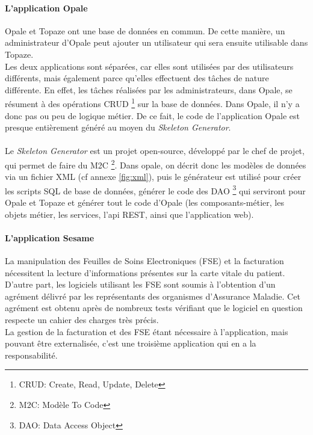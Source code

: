 \paragraph*{L'application Opale\\}
Opale et Topaze ont une base de données en commun. De cette manière, un administrateur d'Opale peut ajouter un utilisateur qui sera ensuite utilisable dans Topaze. \\
Les deux applications sont séparées, car elles sont utilisées par des utilisateurs différents, mais également parce qu'elles effectuent des tâches de nature différente. En effet, les tâches réalisées par les administrateurs, dans Opale, se résument à des opérations CRUD \footnote{CRUD: Create, Read, Update, Delete} sur la base de données. Dans Opale, il n'y a donc pas ou peu de logique métier. 
De ce fait, le code de l'application Opale est presque entièrement généré au moyen du \textit{Skeleton Generator}.\\ \\
Le \textit{Skeleton Generator} est un projet open-source, développé par le chef de projet, qui permet de faire du M2C \footnote{M2C: Modèle To Code}. Dans opale, on décrit donc les modèles de données via un fichier XML (cf annexe \ref{fig:xml}), puis le générateur est utilisé pour créer les scripts SQL de base de données, générer le code des DAO \footnote{DAO: Data Access Object} qui serviront pour Opale et Topaze et générer tout le code d'Opale (les composants-métier, les objets métier, les services, l'api REST, ainsi que l'application web). 

\paragraph*{L'application Sesame\\}

La manipulation des Feuilles de Soins Electroniques (\gls{FSE}) et la facturation nécessitent la lecture d'informations présentes sur la carte vitale du patient. D'autre part, les logiciels utilisant les \gls{FSE} sont soumis à l’obtention d’un agrément délivré
par les représentants des organismes d’Assurance Maladie. Cet agrément est obtenu après de
nombreux tests vérifiant que le logiciel en question respecte un cahier des charges très précis.\\
La gestion de la facturation et des \gls{FSE} étant nécessaire à l’application, mais pouvant
être externalisée, c’est une troisième application qui en a la responsabilité. \\

